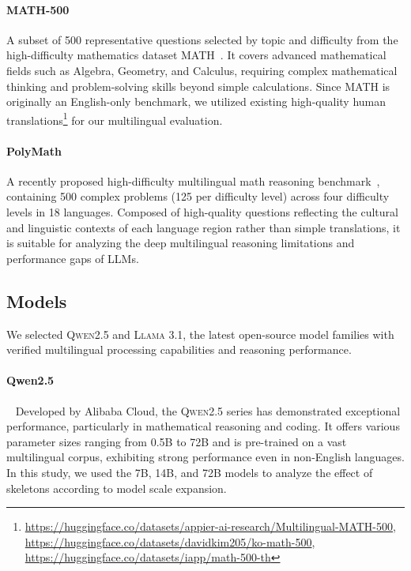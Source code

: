 \paragraph{MATH-500}
A subset of 500 representative questions selected by topic and difficulty from the high-difficulty mathematics dataset MATH~\citep{hendrycks2measuring}. It covers advanced mathematical fields such as Algebra, Geometry, and Calculus, requiring complex mathematical thinking and problem-solving skills beyond simple calculations. Since MATH is originally an English-only benchmark, we utilized existing high-quality human translations\footnote{\url{https://huggingface.co/datasets/appier-ai-research/Multilingual-MATH-500}, \url{https://huggingface.co/datasets/davidkim205/ko-math-500}, \url{https://huggingface.co/datasets/iapp/math-500-th}} for our multilingual evaluation.

\paragraph{PolyMath}
A recently proposed high-difficulty multilingual math reasoning benchmark~\citep{wang2025polymath}, containing 500 complex problems (125 per difficulty level) across four difficulty levels in 18 languages. Composed of high-quality questions reflecting the cultural and linguistic contexts of each language region rather than simple translations, it is suitable for analyzing the deep multilingual reasoning limitations and performance gaps of LLMs.

\subsection{Models}
We selected \textsc{Qwen2.5} and \textsc{Llama 3.1}, the latest open-source model families with verified multilingual processing capabilities and reasoning performance.

\paragraph{Qwen2.5}~\citep{qwen2025qwen25technicalreport}
Developed by Alibaba Cloud, the \textsc{Qwen2.5} series has demonstrated exceptional performance, particularly in mathematical reasoning and coding. It offers various parameter sizes ranging from 0.5B to 72B and is pre-trained on a vast multilingual corpus, exhibiting strong performance even in non-English languages. In this study, we used the 7B, 14B, and 72B models to analyze the effect of skeletons according to model scale expansion.

